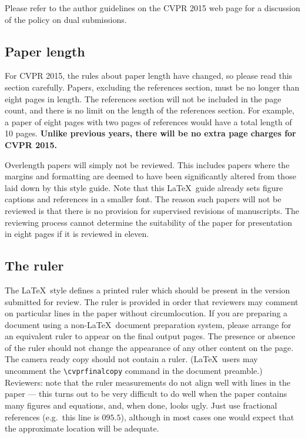 \documentclass[10pt,twocolumn,letterpaper]{article}
\begin{document}
Please refer to the author guidelines on the CVPR 2015 web page for a
discussion of the policy on dual submissions.

\subsection{Paper length}
For CVPR 2015, the rules about paper length have changed, so please
read this section carefully. Papers, excluding the references section,
must be no longer than eight pages in length. The references section
will not be included in the page count, and there is no limit on the
length of the references section. For example, a paper of eight pages
with two pages of references would have a total length of 10 pages.
{\bf Unlike previous years, there will be no extra page charges for
  CVPR 2015.}

Overlength papers will simply not be reviewed.  This includes papers
where the margins and formatting are deemed to have been significantly
altered from those laid down by this style guide.  Note that this
\LaTeX\ guide already sets figure captions and references in a smaller font.
The reason such papers will not be reviewed is that there is no provision for
supervised revisions of manuscripts.  The reviewing process cannot determine
the suitability of the paper for presentation in eight pages if it is
reviewed in eleven.

\subsection{The ruler}
The \LaTeX\ style defines a printed ruler which should be present in the
version submitted for review.  The ruler is provided in order that
reviewers may comment on particular lines in the paper without
circumlocution.  If you are preparing a document using a non-\LaTeX\
document preparation system, please arrange for an equivalent ruler to
appear on the final output pages.  The presence or absence of the ruler
should not change the appearance of any other content on the page.  The
camera ready copy should not contain a ruler. (\LaTeX\ users may uncomment
the \verb'\cvprfinalcopy' command in the document preamble.)  Reviewers:
note that the ruler measurements do not align well with lines in the paper
--- this turns out to be very difficult to do well when the paper contains
many figures and equations, and, when done, looks ugly.  Just use fractional
references (e.g.\ this line is $095.5$), although in most cases one would
expect that the approximate location will be adequate.
\end{document}
